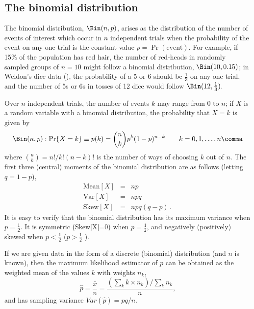 \documentclass[11pt]{book}\usepackage[]{graphicx}\usepackage[]{color}
\begin{document}



\subsection{The binomial distribution}\label{sec:binomial}
The binomial distribution, $\Bin(n, p)$, 
arises as the distribution of the
number of events of interest which occur in $n$ independent trials
when the probability of the event on any one trial is the constant
value $p = \Pr ( \textrm{event} )$.
For example, if 15\% of the population has red hair,
the number of red-heads in randomly sampled groups of $n=10$
might follow a binomial distribution, $\Bin(10, 0.15)$;
in Weldon's dice data (), the probability of
a 5 or 6 should be $\frac13$ on any one trial, and
the number of 5s or 6s in tosses of 12 dice would follow
$\Bin(12, \frac13)$.

Over $n$ independent trials, the number of events  $k$
may range from 0 to $n$; if $X$ is a random variable
with a binomial distribution, the probability that $X = k$ is given
by
\begin{equation}\label{eq:binom}
\Bin(n,p): \Pr \{ X = k \} \equiv p ( k )  =
{n \choose k} p^k (1-p)^{n-k}
  \quad\quad k = 0, 1, \dots, n
  \comma
\end{equation}
where ${n \choose k} = n! / k! (n - k)!$ is the number of ways
of choosing $k$ out of $n$.
The first three (central) moments of the binomial distribution are
as follows 
(letting $q = 1 - p$),
\begin{eqnarray*}
\textrm{Mean}[X] & = & n p  \\
\textrm{Var}[X] &  = & n p q \\
\textrm{Skew}[X] & = & n p q (q - p) 
\period
\end{eqnarray*}
It is easy to verify that
the binomial distribution has its maximum variance when $p = \frac12$.
It is symmetric (Skew[X]=0) when $p = \frac12$, and negatively (positively)
skewed when $p < \frac12$ ($p > \frac12$ ).

If we are given data in the form of a discrete (binomial) distribution
(and $n$ is known),
then the maximum likelihood estimator of $p$ can be obtained
as the weighted mean of the values $k$ with weights $n_k$,
\begin{equation*}%
\hat{p} = \frac{\bar{x}}{n} =
  \frac{(\sum_{k} k \times n_k ) / \sum_k n_k}{n}
  \comma
\end{equation*}
and has sampling variance $Var(\hat{p}) = pq/n$.
\end{document}
